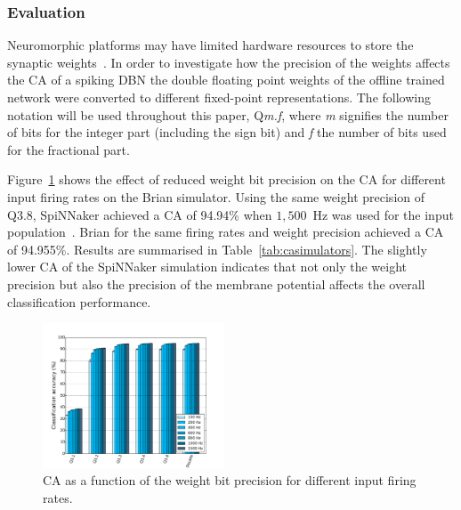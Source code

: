 \subsubsection{Evaluation}


Neuromorphic platforms may have limited hardware resources to store the synaptic weights~\citep{schemmel2010wafer,merolla2014million}. In order to investigate how the precision of the weights affects the CA of a spiking DBN the double floating point weights of the offline trained network were converted to different fixed-point representations. The following notation will be used throughout this paper, Q\textit{m.f}, where \textit{m} signifies the number of bits for the integer part (including the sign bit) and \textit{f} the number of bits used for the fractional part.

Figure~\ref{Fig:brianCAfiringrate} shows the effect of reduced weight bit precision on the CA for different input firing rates on the Brian simulator.
Using the same weight precision of Q3.8, SpiNNaker achieved a CA of 94.94\% when $1,500$~Hz was used for the input population~\citep{Stromatias2015scalable}. Brian for the same firing rates and weight precision achieved a CA of 94.955\%. Results are summarised in Table~\ref{tab:casimulators}.
The slightly lower CA of the SpiNNaker simulation indicates that not only the weight precision but also the precision of the membrane potential affects the overall classification performance.    

\begin{figure}[hbt!]
	\centering
	\includegraphics[width=0.48\textwidth]{images/evan/cavsfiringrate.pdf}
	\caption{CA as a function of the weight bit precision for different input firing rates.}
	\label{Fig:brianCAfiringrate}
\end{figure} 


